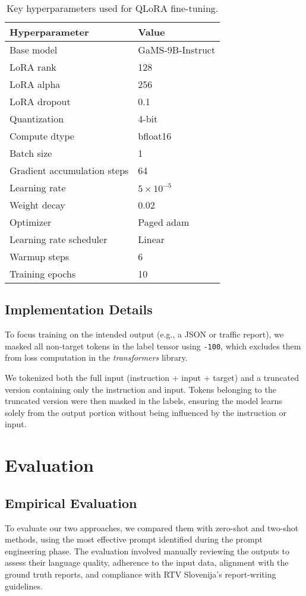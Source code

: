 \documentclass[fleqn,moreauthors,10pt]{ds_report}
\begin{document}
\begin{table}[h]
\centering
\begin{tabular}{|l|l|}
\hline
\textbf{Hyperparameter} & \textbf{Value} \\
\hline
Base model & GaMS-9B-Instruct \\
LoRA rank & 128 \\
LoRA alpha & 256 \\
LoRA dropout & 0.1 \\
Quantization & 4-bit \\
Compute dtype & bfloat16 \\
Batch size & 1 \\
Gradient accumulation steps & 64 \\
Learning rate & $5 \times 10^{-5}$ \\
Weight decay & 0.02 \\
Optimizer & Paged adam \\
Learning rate scheduler & Linear \\
Warmup steps & 6 \\
Training epochs & 10 \\
\hline
\end{tabular}
\caption{Key hyperparameters used for QLoRA fine-tuning.}
\end{table}

\subsection*{Implementation Details}
To focus training on the intended output (e.g., a JSON or traffic report), we masked all non-target tokens in the label tensor using \texttt{-100}, which excludes them from loss computation in the \textit{transformers} library.

We tokenized both the full input (instruction + input + target) and a truncated version containing only the instruction and input. Tokens belonging to the truncated version were then masked in the labels, ensuring the model learns solely from the output portion without being influenced by the instruction or input.

\section*{Evaluation}
\subsection*{Empirical Evaluation}
To evaluate our two approaches, we compared them with zero-shot and two-shot methods, using the most effective prompt identified during the prompt engineering phase. The evaluation involved manually reviewing the outputs to assess their language quality, adherence to the input data, alignment with the ground truth reports, and compliance with RTV Slovenija’s report-writing guidelines.
\end{document}
